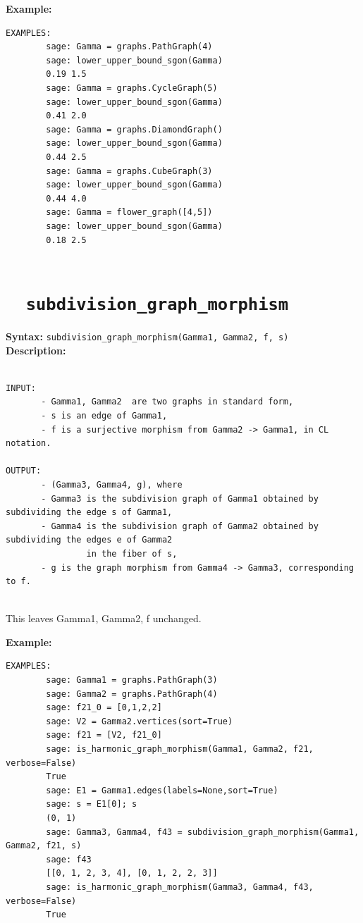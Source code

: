 \documentclass{article}
\begin{document}
\textbf{Example:}
\begin{verbatim}
EXAMPLES:
        sage: Gamma = graphs.PathGraph(4)
        sage: lower_upper_bound_sgon(Gamma)
        0.19 1.5
        sage: Gamma = graphs.CycleGraph(5)
        sage: lower_upper_bound_sgon(Gamma)
        0.41 2.0
        sage: Gamma = graphs.DiamondGraph()
        sage: lower_upper_bound_sgon(Gamma)
        0.44 2.5
        sage: Gamma = graphs.CubeGraph(3)
        sage: lower_upper_bound_sgon(Gamma)
        0.44 4.0
        sage: Gamma = flower_graph([4,5])
        sage: lower_upper_bound_sgon(Gamma)
        0.18 2.5


\end{verbatim}

\section{\tt \ \ subdivision\_graph\_morphism}

\textbf{Syntax:} \verb}subdivision_graph_morphism(Gamma1, Gamma2, f, s)}\\

\textbf{Description:}
\begin{verbatim}

INPUT:
       - Gamma1, Gamma2  are two graphs in standard form,
       - s is an edge of Gamma1,
       - f is a surjective morphism from Gamma2 -> Gamma1, in CL notation.

OUTPUT:
       - (Gamma3, Gamma4, g), where
       - Gamma3 is the subdivision graph of Gamma1 obtained by subdividing the edge s of Gamma1, 
       - Gamma4 is the subdivision graph of Gamma2 obtained by subdividing the edges e of Gamma2
                in the fiber of s, 
       - g is the graph morphism from Gamma4 -> Gamma3, corresponding to f.
    
\end{verbatim}

This leaves Gamma1, Gamma2, f unchanged.

\textbf{Example:}
\begin{verbatim}
EXAMPLES:
        sage: Gamma1 = graphs.PathGraph(3)
        sage: Gamma2 = graphs.PathGraph(4)
        sage: f21_0 = [0,1,2,2]
        sage: V2 = Gamma2.vertices(sort=True)
        sage: f21 = [V2, f21_0]
        sage: is_harmonic_graph_morphism(Gamma1, Gamma2, f21, verbose=False)
        True
        sage: E1 = Gamma1.edges(labels=None,sort=True)
        sage: s = E1[0]; s
        (0, 1)
        sage: Gamma3, Gamma4, f43 = subdivision_graph_morphism(Gamma1, Gamma2, f21, s)
        sage: f43
        [[0, 1, 2, 3, 4], [0, 1, 2, 2, 3]]
        sage: is_harmonic_graph_morphism(Gamma3, Gamma4, f43, verbose=False)
        True
\end{verbatim}
\end{document}

